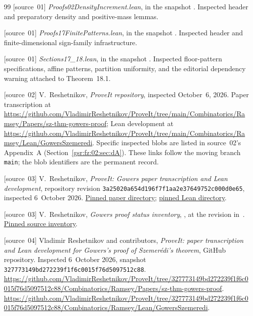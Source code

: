 \documentclass[11pt,letterpaper]{article}
\numberwithin{equation}{section}
\theoremstyle{definition}
\theoremstyle{remark}
\newcommand{\1}{\mathbf 1}
\newcommand{\revision}{\texttt{3a25020a654d196f7f1aa2e37649752c000d0e65}}
\begin{document}
\begin{thebibliography}{99}
[source~01] \emph{Proofs02DensityIncrement.lean}, in the snapshot \cite{repo01}. Inspected header and preparatory density and positive-mass lemmas.

[source~01] \emph{Proofs17FinitePatterns.lean}, in the snapshot \cite{repo01}. Inspected header and finite-dimensional sign-family infrastructure.

[source~01] \emph{Sections17\_18.lean}, in the snapshot \cite{repo01}. Inspected floor-pattern specifications, affine patterns, partition uniformity, and the editorial dependency warning attached to Theorem~18.1.

[source~02] V.~Reshetnikov, \emph{ProveIt repository}, inspected October~6, 2026. Paper transcription at \url{https://github.com/VladimirReshetnikov/ProveIt/tree/main/Combinatorics/Ramsey/Papers/sz-thm-gowers-proof}; Lean development at \url{https://github.com/VladimirReshetnikov/ProveIt/tree/main/Combinatorics/Ramsey/Lean/GowersSzemeredi}. Specific inspected blobs are listed in source~02's Appendix~A (Section~\ref{gsr:fz:02:sec:dA}). These links follow the moving branch \texttt{main}; the blob identifiers are the permanent record.

[source~03] V.~Reshetnikov, \emph{ProveIt: Gowers paper transcription and Lean development}, repository revision \revision, inspected 6~October 2026. \href{https://github.com/VladimirReshetnikov/ProveIt/tree/3a25020a654d196f7f1aa2e37649752c000d0e65/Combinatorics/Ramsey/Papers/sz-thm-gowers-proof}{Pinned paper directory}; \href{https://github.com/VladimirReshetnikov/ProveIt/tree/3a25020a654d196f7f1aa2e37649752c000d0e65/Combinatorics/Ramsey/Lean/GowersSzemeredi}{pinned Lean directory}.

[source~03] V.~Reshetnikov, \emph{Gowers proof status inventory}, , at the revision in~\cite{repo03}. \href{https://github.com/VladimirReshetnikov/ProveIt/blob/3a25020a654d196f7f1aa2e37649752c000d0e65/Combinatorics/Ramsey/gowers-proof-status.json}{Pinned source inventory}.

[source~04] Vladimir Reshetnikov and contributors, \emph{ProveIt: paper transcription and Lean development for Gowers's proof of Szemer\'edi's theorem}, GitHub repository. Inspected 6~October 2026, snapshot \texttt{327773149bd272239f1f6c0015f76d5097512c88}. \url{https://github.com/VladimirReshetnikov/ProveIt/tree/327773149bd272239f1f6c0015f76d5097512c88/Combinatorics/Ramsey/Papers/sz-thm-gowers-proof}. \url{https://github.com/VladimirReshetnikov/ProveIt/tree/327773149bd272239f1f6c0015f76d5097512c88/Combinatorics/Ramsey/Lean/GowersSzemeredi}.


\end{thebibliography}
\end{document}
